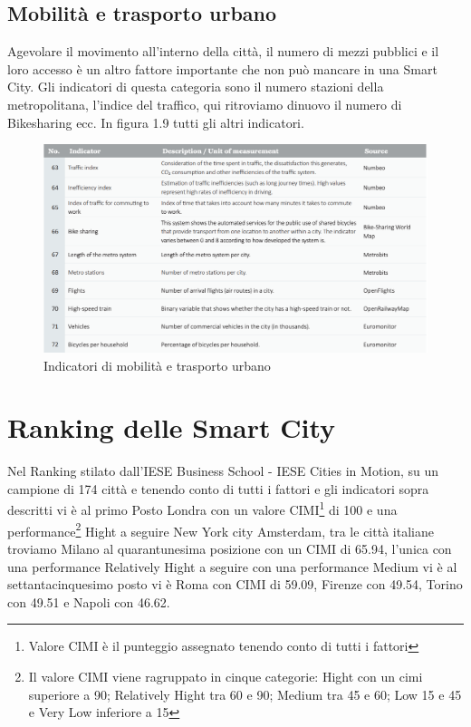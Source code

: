 \subsection{Mobilità e trasporto urbano}
Agevolare il movimento all'interno della città, il numero di mezzi pubblici e il loro accesso è un altro fattore importante che non può mancare in una Smart City. Gli indicatori di questa categoria sono il numero stazioni della metropolitana, l'indice del traffico, qui ritroviamo dinuovo il numero di Bikesharing ecc.
In figura 1.9 tutti gli altri indicatori.
\begin{figure}[ht]
	\begin{center}
		\includegraphics[width=320bp]{img/indicatori_trasporti_urbani.png}
		\caption{Indicatori di mobilità e trasporto urbano}
	\end{center}
\end{figure}

\section{Ranking delle Smart City}
Nel Ranking stilato dall'IESE Business School - IESE Cities in Motion, su un campione di 174 città e tenendo conto di tutti i fattori e gli indicatori sopra descritti vi è al primo Posto Londra con un valore CIMI\footnote{Valore CIMI è il punteggio assegnato tenendo conto di tutti i fattori} di 100 e una performance\footnote{Il valore CIMI viene ragruppato in cinque categorie: Hight con un cimi superiore a 90; Relatively Hight tra 60 e 90; Medium tra 45 e 60; Low 15 e 45 e Very Low inferiore a 15 } Hight a seguire New York city Amsterdam, tra le città italiane troviamo Milano al quarantunesima posizione con un CIMI di 65.94, l'unica con una performance Relatively Hight a seguire con una performance Medium vi è al settantacinquesimo posto vi è Roma con CIMI di 59.09, Firenze con 49.54, Torino con 49.51 e Napoli con 46.62.


